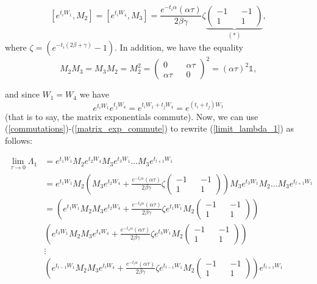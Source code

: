 \documentclass{article}
\begin{document}
\begin{equation}\label{commutations}
  \left[e^{t_iW_1},M_2\right] =   \left[e^{t_iW_4},M_3\right] = \frac{e^{-t_i\alpha}(\alpha\tau)}{2\beta\gamma}\zeta\underbrace{\begin{pmatrix} -1 && -1 \\ 1 && 1 \end{pmatrix}}_{(\ast)},
\end{equation}
where $\zeta = (e^{-t_i(2\beta+\gamma)}-1)$. In addition, we have the equality
\begin{equation}
  M_2M_3 = M_3M_2 = M_2^2 = \begin{pmatrix} 0 && \alpha \tau \\
  \alpha \tau && 0 \end{pmatrix}^2 = (\alpha \tau)^2 \mathbb{1},
\end{equation}

and since $W_1 = W_4$ we have
\begin{equation}\label{matrix_exp_commute}
  e^{t_iW_1}e^{t_jW_4}= e^{t_iW_1+t_jW_4 }= e^{(t_i+t_j)W_1}
\end{equation}
(that is to say, the matrix exponentials commute). Now, we can use (\ref{commutations})-(\ref{matrix_exp_commute}) to rewrite (\ref{limit_lambda_1}) as follows:

\begin{align}
\lim_{\tau \rightarrow 0} \Lambda_1 &=  e^{t_1W_1}M_2e^{t_2W_4}M_3e^{t_3W_1}\ldots M_3e^{t_{l+1}W_1} \nonumber\\ &= e^{t_1W_1}M_2\left(M_3e^{t_2W_4}+\frac{e^{-t_i\alpha}(\alpha\tau)}{2\beta\gamma}\zeta\begin{pmatrix} -1 && -1 \\ 1 && 1 \end{pmatrix}\right)M_3e^{t_3W_1}M_2 \ldots M_3e^{t_{l+1}W_1} \\
&= \left(e^{t_1W_1}M_2M_3e^{t_2W_4}+\frac{e^{-t_2\alpha}(\alpha\tau)}{2\beta\gamma}\zeta e^{t_1W_1}M_2\begin{pmatrix} -1 && -1 \\ 1 && 1 \end{pmatrix}\right) \nonumber \\
&\left(e^{t_3W_1}M_2M_3e^{t_4W_4}+\frac{e^{-t_4\alpha}(\alpha\tau)}{2\beta\gamma}\zeta e^{t_3W_1}M_2\begin{pmatrix} -1 && -1 \\ 1 && 1 \end{pmatrix}\right) \nonumber \\
&\vdots \nonumber \\
&\left(e^{t_{l-1}W_1}M_2M_3e^{t_lW_4}+\frac{e^{-t_{l}\alpha}(\alpha\tau)}{2\beta\gamma}\zeta e^{t_{l-1}W_1}M_2\begin{pmatrix} -1 && -1 \\ 1 && 1 \end{pmatrix}\right)e^{t_{l+1}W_1}
\end{align}
\end{document}
